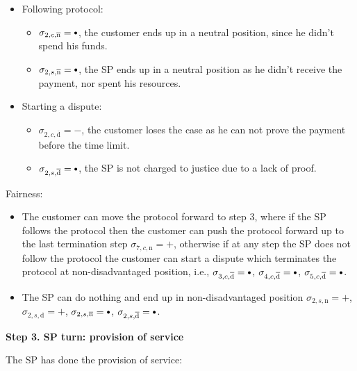 \documentclass{ieeeaccess}
\newcommand\sbullet[1][.75]{\mathbin{\ThisStyle{\vcenter{\hbox{%
  \scalebox{#1}{$\SavedStyle\bullet$}}}}}%
}
\begin{document}
\begin{itemize}
\item
  Following protocol:
  \begin{itemize}
  \item
    \(\sigma_{2, c, \overline{\mathrm{n}}} = \sbullet\), the customer ends up in a neutral position, since he didn't spend his funds.
  \item
    \(\sigma_{2, s, \overline{\mathrm{n}}} = \sbullet\), the SP ends up in a neutral position as he didn't receive the payment, nor spent his resources.
  \end{itemize}
\item
  Starting a dispute:

  \begin{itemize}
  
  \item
    \(\sigma_{2, c, \overline{\mathrm{d}}} = -\), the customer loses the case as he can not prove the payment before the time limit.
  \item
    \(\sigma_{2, s, \overline{\mathrm{d}}} = \sbullet\), the SP is not charged to justice due to a lack of proof.
  \end{itemize}
\end{itemize}

Fairness:

\begin{itemize}

\item
  The customer can move the protocol forward to step 3, where if the
  SP follows the protocol then the customer can push the protocol forward
  up to the last termination step \(\sigma_{7, c, \mathrm{n}} = +\),
  otherwise if at any step the SP does not follow the protocol the
  customer can start a dispute which terminates the protocol at
  non-disadvantaged position, i.e.,
  \(\sigma_{3, c, \overline{\mathrm{d}}} = \sbullet\),
  \(\sigma_{4, c, \overline{\mathrm{d}}} = \sbullet\),
  \(\sigma_{5, c, \overline{\mathrm{d}}} = \sbullet\).
\item
  The SP can do nothing and end up in non-disadvantaged position
  \(\sigma_{2, s, \mathrm{n}} = +\), \(\sigma_{2, s, \mathrm{d}} = +\),
  \(\sigma_{2, s, \overline{\mathrm{n}}} = \sbullet\),
  \(\sigma_{2, s, \overline{\mathrm{d}}} = \sbullet\).
\end{itemize}

\noindent \textbf
{Step 3. SP turn: provision of service}\label{step-3-provision-of-service}

The SP has done the provision of service:
\end{document}
